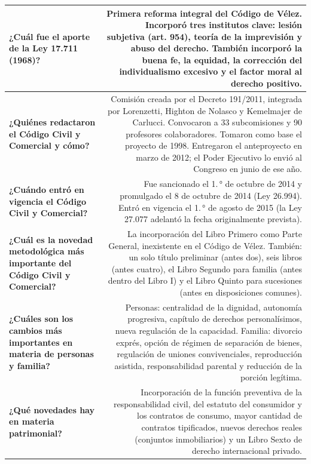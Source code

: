 \documentclass[12pt,oneside]{book}
\begin{document}
\begin{longtable}{Q|N}
\textbf{¿Cuál fue el aporte de la Ley 17.711 (1968)?} &
Primera reforma integral del Código de Vélez. Incorporó tres institutos clave: lesión subjetiva (art. 954), teoría de la imprevisión y abuso del derecho. También incorporó la buena fe, la equidad, la corrección del individualismo excesivo y el factor moral al derecho positivo. \\
\midrule

\textbf{¿Quiénes redactaron el Código Civil y Comercial y cómo?} &
Comisión creada por el Decreto 191/2011, integrada por Lorenzetti, Highton de Nolasco y Kemelmajer de Carlucci. Convocaron a 33 subcomisiones y 90 profesores colaboradores. Tomaron como base el proyecto de 1998. Entregaron el anteproyecto en marzo de 2012; el Poder Ejecutivo lo envió al Congreso en junio de ese año. \\
\midrule

\textbf{¿Cuándo entró en vigencia el Código Civil y Comercial?} &
Fue sancionado el 1.\,° de octubre de 2014 y promulgado el 8 de octubre de 2014 (Ley 26.994). Entró en vigencia el 1.\,° de agosto de 2015 (la Ley 27.077 adelantó la fecha originalmente prevista). \\
\midrule

\textbf{¿Cuál es la novedad metodológica más importante del Código Civil y Comercial?} &
La incorporación del Libro Primero como Parte General, inexistente en el Código de Vélez. También: un solo título preliminar (antes dos), seis libros (antes cuatro), el Libro Segundo para familia (antes dentro del Libro I) y el Libro Quinto para sucesiones (antes en disposiciones comunes). \\
\midrule

\textbf{¿Cuáles son los cambios más importantes en materia de personas y familia?} &
Personas: centralidad de la dignidad, autonomía progresiva, capítulo de derechos personalísimos, nueva regulación de la capacidad. Familia: divorcio exprés, opción de régimen de separación de bienes, regulación de uniones convivenciales, reproducción asistida, responsabilidad parental y reducción de la porción legítima. \\
\midrule

\textbf{¿Qué novedades hay en materia patrimonial?} &
Incorporación de la función preventiva de la responsabilidad civil, del estatuto del consumidor y los contratos de consumo, mayor cantidad de contratos tipificados, nuevos derechos reales (conjuntos inmobiliarios) y un Libro Sexto de derecho internacional privado. \\
\midrule


\end{longtable}
\end{document}
